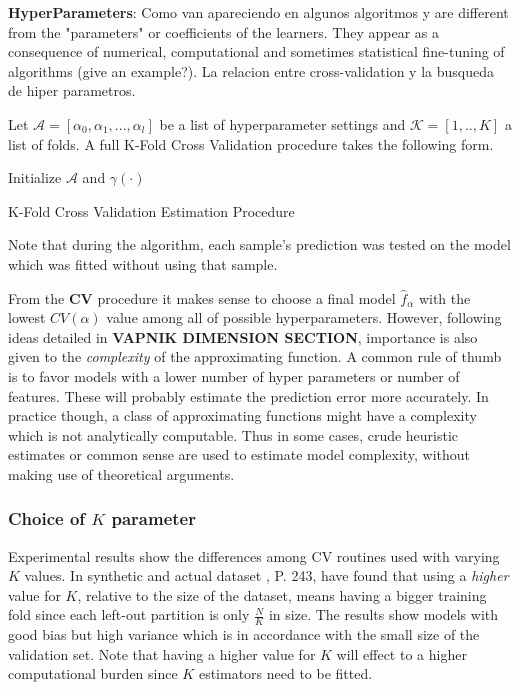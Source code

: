 \textbf{HyperParameters}:
 Como van apareciendo en algunos algoritmos y are different from the "parameters" or coefficients of the learners. They appear as a consequence of numerical, computational and sometimes statistical fine-tuning of algorithms (give an example?). 
 La relacion entre cross-validation y la busqueda de hiper parametros. 
 

 Let $\mathcal{A} = [\alpha_0, \alpha_1,..., \alpha_l   ]$ be a list of hyperparameter settings and  $\mathcal{K} =[1,..,K]$ a list of folds.  A full K-Fold Cross Validation procedure takes the following form.
 
 \begin{algorithm}%
 	\SetAlgoLined
 	Initialize $\mathcal{A}$ and $\gamma(\cdot)$\;
 \caption{K-Fold Cross Validation Estimation Procedure}
\end{algorithm}

Note that during the algorithm, each sample's prediction was tested on the model which was fitted without using that sample. 

From the \textbf{CV} procedure it makes sense to choose a final  model $\hat{f}_\alpha$ with the lowest $CV(\alpha)$ value among all of possible hyperparameters. However, following ideas detailed in \textbf{VAPNIK DIMENSION SECTION}, importance is also given to the \textit{complexity} of the approximating function. A common rule of thumb is to favor models with a lower number of hyper parameters or number of features. These will probably estimate the prediction error more accurately. In practice though, a class of approximating functions might have a complexity which is not analytically computable. Thus in some cases, crude heuristic estimates or common sense are used to estimate model complexity, without making use of theoretical arguments.
 
\subsubsection{Choice of $K$ parameter} 

Experimental results show the differences among CV routines used with varying $K$ values. In synthetic and actual dataset , \cite{hastie-elemstatslearn} P. 243, have found that using a \textit{higher} value for $K$, relative to the size of the dataset, means having a bigger training fold since each left-out partition is only $\frac{N}{K}$ in size. The results show models with good bias but high variance which is in accordance with the small size of the validation set. Note that having a higher value for $K$ will effect to a higher computational burden since $K$ estimators need to be fitted.

